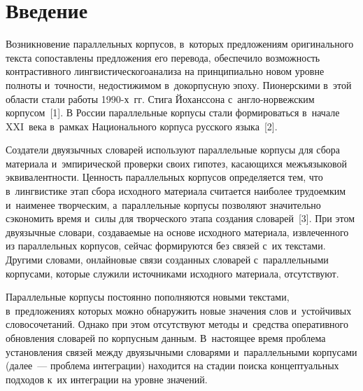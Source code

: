 
  
\vspace*{3pt}



\thispagestyle{headings}

\begin{multicols}{2}

\label{st\stat}
  
\section{Введение}

\vspace*{-9pt}

  Возникновение параллельных корпусов, в~которых предложениям 
оригинального текста со\-по\-став\-ле\-ны предложения его перевода, обеспечило 
возможность контрастивного лингвистического\linebreak \mbox{анализа} на принципиально 
новом уровне полноты и~точности, недостижимом в~докорпусную эпоху. 
Пионерскими в~этой области стали работы \mbox{1990-х~гг}. Стига Йоханссона  
с~анг\-ло-нор\-веж\-ским корпусом~[1]. В России параллельные корпусы стали 
формироваться в~начале XXI~века в~рамках Национального корпуса русского 
языка~[2].
  
  Создатели двуязычных словарей используют параллельные корпусы для 
сбора материала и~эмпирической проверки своих гипотез, касающихся 
межъязы\-ко\-вой эквивалентности. Ценность параллельных корпусов 
определяется тем, что в~лингвистике этап сбора исходного материала считается 
наиболее трудоемким и~наименее творческим, а~параллельные корпусы 
позволяют значительно сэкономить время и~силы для творческого этапа 
создания словарей~[3].
  При этом двуязычные словари, создаваемые на основе исходного материала, 
извлеченного из параллельных корпусов, сейчас формируются без связей с~их 
текстами. Другими словами, онлайновые связи созданных словарей 
с~параллельными корпусами, которые служили источниками исходного 
материала, отсутствуют. 

Параллельные корпусы постоянно пополняются 
новыми текстами, в~предложениях которых можно обнаружить новые значения 
слов и~устойчивых словосочетаний. Однако при этом отсутствуют методы 
и~средства оперативного обновления словарей по корпусным данным. 
В~настоящее время проблема установления связей между двуязычными 
словарями и~параллельными корпусами (далее~--- проблема интеграции) 
находится на стадии поиска концептуальных подходов к~их интеграции на 
уровне значений.
  

\end{multicols}
